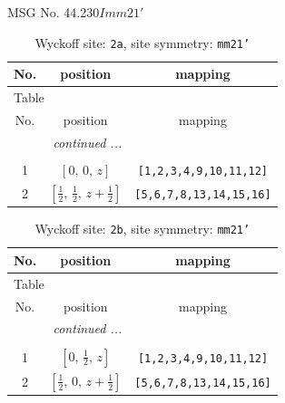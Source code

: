 \documentclass[fleqn,8pt]{jsarticle}
\begin{document}
\setcounter{MaxMatrixCols}{32}

\renewcommand{\tablename}{Table~}
\renewcommand{\figurename}{Figure~}
\begin{center}
\LARGE
MSG No. 44.230\quad$Imm21'$
\end{center}
\renewcommand{\arraystretch}{1.2}
\begin{longtable}{ccc}
\caption{Wyckoff site: {\tt 2a}, site symmetry: {\tt mm21'}}
 \\
 \hline \hline
No. & position & mapping \\ \hline \endfirsthead

\multicolumn{2}{l}{\tablename\ \thetable{}} \\
 \hline \hline
No. & position & mapping \\ \hline \endhead

 \hline \hline
\multicolumn{2}{r}{\footnotesize\it continued ...} \\ \endfoot

 \hline \hline
\multicolumn{2}{r}{} \\ \endlastfoot

1 & $\left[ 0,\, 0,\, z \right]$ & {\tt [1,2,3,4,9,10,11,12]} \\ \hline
2 & $\left[ \frac{1}{2},\, \frac{1}{2},\, z + \frac{1}{2} \right]$ & {\tt [5,6,7,8,13,14,15,16]} \\
\end{longtable}
\renewcommand{\arraystretch}{1.2}
\begin{longtable}{ccc}
\caption{Wyckoff site: {\tt 2b}, site symmetry: {\tt mm21'}}
 \\
 \hline \hline
No. & position & mapping \\ \hline \endfirsthead

\multicolumn{2}{l}{\tablename\ \thetable{}} \\
 \hline \hline
No. & position & mapping \\ \hline \endhead

 \hline \hline
\multicolumn{2}{r}{\footnotesize\it continued ...} \\ \endfoot

 \hline \hline
\multicolumn{2}{r}{} \\ \endlastfoot

1 & $\left[ 0,\, \frac{1}{2},\, z \right]$ & {\tt [1,2,3,4,9,10,11,12]} \\ \hline
2 & $\left[ \frac{1}{2},\, 0,\, z + \frac{1}{2} \right]$ & {\tt [5,6,7,8,13,14,15,16]} \\
\end{longtable}
\end{document}
